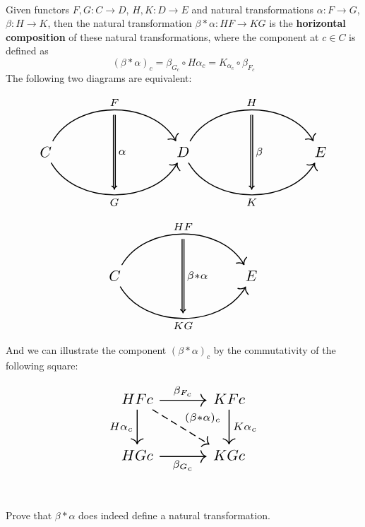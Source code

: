 \documentclass{article}
\begin{document}
\begin{definition}
\

Given functors $F, G: C \to D$, $H, K: D \to E$ and natural transformations $\alpha: F \to G$, $\beta: H\to K$, then the natural transformation $\beta * \alpha: HF \to KG$ is the \textbf{horizontal composition} of these natural transformations, where the component at $c \in C$ is defined as $$(\beta * \alpha)_c = \beta_{G_c} \circ H\alpha_c = K_{\alpha_c} \circ \beta_{F_c}$$The following two diagrams are equivalent:

\[
\begin{tikzcd}[
    column sep=4cm, 
    row sep=huge, 
    nodes={scale=1.5}, 
    every arrow/.append style={line width=1pt} 
]
    C & D & E
    \arrow[from=1-1, to=1-2, bend left = 60, "F"{name=F}]
    \arrow[from=1-1, to=1-2, bend right = 60, "G"'{name=G}]
    \arrow[from=1-2, to=1-3, bend left = 60, "H"{name=H}]
    \arrow[from=1-2, to=1-3, bend right = 60, "K"'{name=K}]
    \arrow[Rightarrow, from=F, to=G, "\alpha", shorten <= 5pt, shorten >= 5pt]
    \arrow[Rightarrow, from=H, to=K, "\beta", shorten <= 5pt, shorten >= 5pt]
\end{tikzcd}
\]

\[
\begin{tikzcd}[
    column sep=4cm, 
    row sep=huge, 
    nodes={scale=1.5}, 
    every arrow/.append style={line width=1pt} 
]
    C & E
    \arrow[from=1-1, to=1-2, bend left = 60, "HF"{name=F}]
    \arrow[from=1-1, to=1-2, bend right = 60, "KG"'{name=H}]
    \arrow[Rightarrow, from=F, to=H, "\beta * \alpha", shorten <= 5pt, shorten >= 5pt]
\end{tikzcd}
\]

And we can illustrate the component $(\beta * \alpha)_c$ by the commutativity of the following square:

\[\begin{tikzcd}[
    column sep=huge, 
    row sep=huge, 
    nodes={scale=1.5}, 
    every arrow/.append style={line width=1pt} 
]
    HFc & KFc\\
    HGc & KGc
    \arrow[from=1-1, to=1-2, "\beta_{F_c}"]
    \arrow[from=1-1, to=2-1, "H\alpha_c"']
    \arrow[from=2-1, to=2-2, "\beta_{G_c}"']
    \arrow[from=1-2, to=2-2, "K\alpha_c"]
    \arrow[dashed,from=1-1, to=2-2, "(\beta * \alpha)_c"]
\end{tikzcd}\]
\end{definition}

\begin{lemma}
\

Prove that $\beta * \alpha$ does indeed define a natural transformation. 
\end{lemma}
\end{document}
